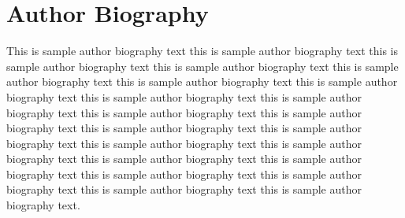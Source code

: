 \documentclass[AMA,LATO1COL]{WileyNJD-v2}
\begin{document}


\maketitle





%

%

%

%

%

%



\nocite{*}%


%


\section*{Author Biography}
\begin{biography}{%
This is sample author biography text this is sample author biography text this is sample author biography text this is sample author biography text this is sample author biography text this is sample author biography text this is sample author biography text this is sample author biography text this is sample author biography text this is sample author biography text this is sample author biography text this is sample author biography text this is sample author biography text this is sample author biography text this is sample author biography text this is sample author biography text this is sample author biography text this is sample author biography text this is sample author biography text this is sample author biography text this is sample author biography text.}
\end{biography}
\end{document}
